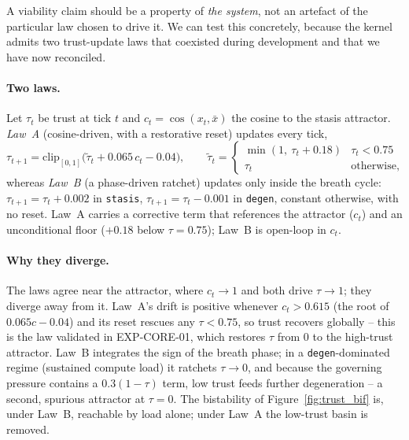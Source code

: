 \documentclass[11pt, a4paper]{article}
\begin{document}
A viability claim should be a property of \emph{the system}, not an artefact of
the particular law chosen to drive it. We can test this concretely, because the
kernel admits two trust-update laws that coexisted during development and that we
have now reconciled.

\paragraph{Two laws.}
Let $\tau_t$ be trust at tick $t$ and $c_t = \cos(x_t,\bar{x})$ the cosine to the
stasis attractor. \emph{Law~A} (cosine-driven, with a restorative reset) updates
every tick,
\[
  \tau_{t+1} = \mathrm{clip}_{[0,1]}\!\big(\tilde\tau_t + 0.065\,c_t - 0.04\big),
  \qquad
  \tilde\tau_t =
  \begin{cases}
    \min(1,\ \tau_t + 0.18) & \tau_t < 0.75\\
    \tau_t & \text{otherwise,}
  \end{cases}
\]
whereas \emph{Law~B} (a phase-driven ratchet) updates only inside the breath
cycle: $\tau_{t+1} = \tau_t + 0.002$ in \texttt{stasis},
$\tau_{t+1} = \tau_t - 0.001$ in \texttt{degen}, constant otherwise, with no
reset. Law~A carries a corrective term that references the attractor ($c_t$) and
an unconditional floor ($+0.18$ below $\tau = 0.75$); Law~B is open-loop in
$c_t$.

\paragraph{Why they diverge.}
The laws agree near the attractor, where $c_t\to 1$ and both drive
$\tau\to 1$; they diverge away from it. Law~A's drift is positive whenever
$c_t > 0.615$ (the root of $0.065c-0.04$) and its reset rescues any
$\tau < 0.75$, so trust recovers globally -- this is the law validated in
EXP-CORE-01, which restores $\tau$ from $0$ to the high-trust attractor. Law~B
integrates the sign of the breath phase; in a \texttt{degen}-dominated regime
(sustained compute load) it ratchets $\tau\to 0$, and because the governing
pressure contains a $0.3(1-\tau)$ term, low trust feeds further degeneration --
a second, spurious attractor at $\tau = 0$. The bistability of
Figure~\ref{fig:trust_bif} is, under Law~B, reachable by load alone; under Law~A
the low-trust basin is removed.
\end{document}
